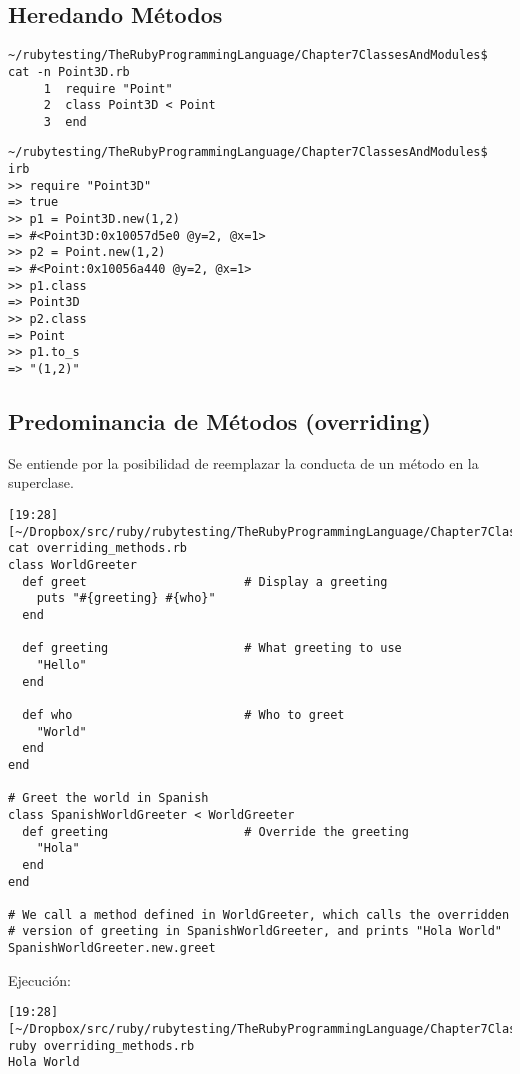 \subsection{Heredando Métodos}

\begin{verbatim}
~/rubytesting/TheRubyProgrammingLanguage/Chapter7ClassesAndModules$ cat -n Point3D.rb 
     1  require "Point"
     2  class Point3D < Point
     3  end
\end{verbatim}

\begin{verbatim}
~/rubytesting/TheRubyProgrammingLanguage/Chapter7ClassesAndModules$ irb
>> require "Point3D"
=> true
>> p1 = Point3D.new(1,2)
=> #<Point3D:0x10057d5e0 @y=2, @x=1>
>> p2 = Point.new(1,2)
=> #<Point:0x10056a440 @y=2, @x=1>
>> p1.class
=> Point3D
>> p2.class
=> Point
>> p1.to_s
=> "(1,2)"
\end{verbatim}

\subsection{Predominancia de Métodos (overriding)}
\label{subsection:overriding}

Se entiende por  la posibilidad de reemplazar la conducta de un método en la superclase.

\begin{verbatim}
[19:28][~/Dropbox/src/ruby/rubytesting/TheRubyProgrammingLanguage/Chapter7ClassesAndModules]$ cat overriding_methods.rb 
class WorldGreeter
  def greet                      # Display a greeting
    puts "#{greeting} #{who}"
  end 

  def greeting                   # What greeting to use 
    "Hello"
  end 

  def who                        # Who to greet
    "World"
  end 
end

# Greet the world in Spanish
class SpanishWorldGreeter < WorldGreeter
  def greeting                   # Override the greeting
    "Hola"
  end 
end

# We call a method defined in WorldGreeter, which calls the overridden
# version of greeting in SpanishWorldGreeter, and prints "Hola World"
SpanishWorldGreeter.new.greet
\end{verbatim}

Ejecución:
\begin{verbatim}
[19:28][~/Dropbox/src/ruby/rubytesting/TheRubyProgrammingLanguage/Chapter7ClassesAndModules]$ ruby overriding_methods.rb 
Hola World

\end{verbatim}

